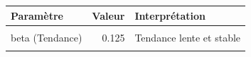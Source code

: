 \centering
\centering
\begin{tabular}[t]{lrl}
\toprule
Paramètre & Valeur & Interprétation\\
\midrule
\cellcolor{gray!10}{alpha (Niveau)} & \cellcolor{gray!10}{0.990} & \cellcolor{gray!10}{Grande réactivité aux observations récentes}\\
beta (Tendance) & 0.125 & Tendance lente et stable\\
\cellcolor{gray!10}{delta (Saisonnalité)} & \cellcolor{gray!10}{1.000} & \cellcolor{gray!10}{Saisonnalité entièrement mise à jour}\\
\bottomrule
\end{tabular}

